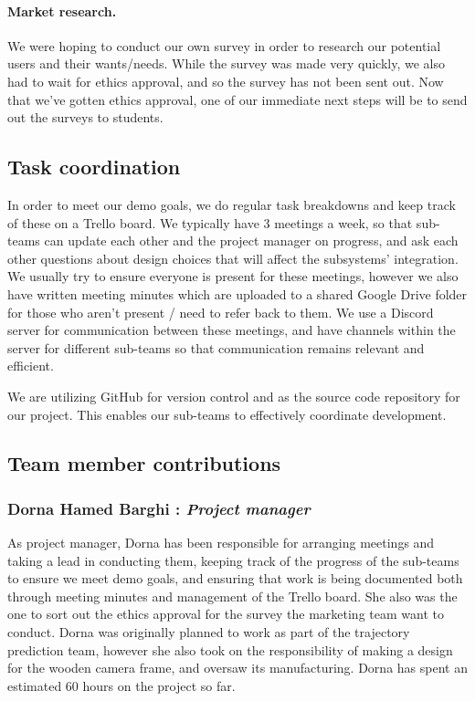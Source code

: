 \documentclass{article}
\begin{document}
\paragraph{Market research.} We were hoping to conduct our own survey in order to research our potential users and their wants/needs. While the survey was made very quickly, we also had to wait for ethics approval, and so the survey has not been sent out. Now that we've gotten ethics approval, one of our immediate next steps will be to send out the surveys to students.

\subsection{Task coordination}
In order to meet our demo goals, we do regular task breakdowns and keep track of these on a Trello board. We typically have 3 meetings a week, so that sub-teams can update each other and the project manager on progress, and ask each other questions about design choices that will affect the subsystems' integration. We usually try to ensure everyone is present for these meetings, however we also have written meeting minutes which are uploaded to a shared Google Drive folder for those who aren't present / need to refer back to them. We use a Discord server for communication between these meetings, and have channels within the server for different sub-teams so that communication remains relevant and efficient. 

We are utilizing GitHub for version control and as the source code repository for our project. This enables our sub-teams to effectively coordinate development. 

\subsection{Team member contributions}
\subsubsection{Dorna Hamed Barghi : \emph{Project manager}}
As project manager, Dorna has been responsible for arranging meetings and taking a lead in conducting them, keeping track of the progress of the sub-teams to ensure we meet demo goals, and ensuring that work is being documented both through meeting minutes and management of the Trello board. She also was the one to sort out the ethics approval for the survey the marketing team want to conduct. Dorna was originally planned to work as part of the trajectory prediction team, however she also took on the responsibility of making a design for the wooden camera frame, and oversaw its manufacturing. Dorna has spent an estimated 60 hours on the project so far. 
\end{document}
